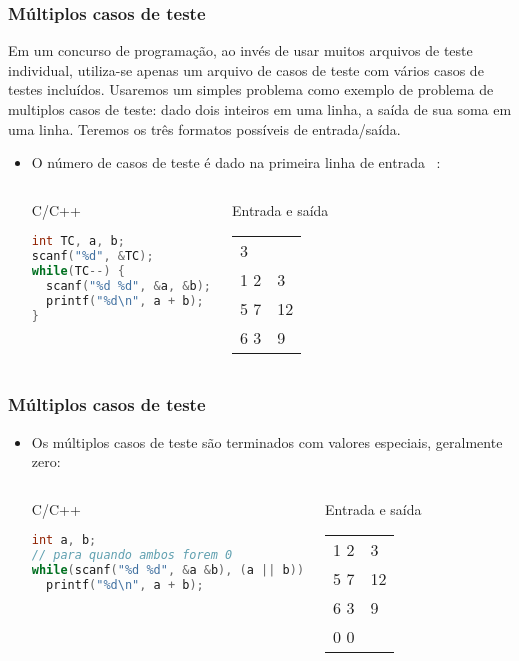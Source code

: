 \begin{frame} [fragile]
  \frametitle{Múltiplos casos de teste}
  {\small Em um concurso de programação, ao invés de usar muitos arquivos de teste individual, utiliza-se apenas um arquivo de casos de teste com vários casos de testes incluídos. Usaremos um simples problema como exemplo de problema de multiplos casos de teste: dado dois inteiros em uma linha, a saída de sua soma em uma linha. Teremos os três formatos possíveis de entrada/saída.}
    \begin{itemize}
      \item {\small O número de casos de teste é dado na primeira linha de entrada ~\cite{halim2013competitive}:}
      \begin{columns}
      \begin{block:ie}{C/C++}
	\begin{lstlisting}[language=c]
int TC, a, b;
scanf("%d", &TC);
while(TC--) {
  scanf("%d %d", &a, &b);
  printf("%d\n", a + b);
}
	\end{lstlisting}
      \end{block:ie}

      \begin{block:ie}{Entrada e saída}
	\begin{tabularx}{\textwidth}{|X|X|}
	  3&\\1 2&3\\5 7&12\\6 3 &9
	\end{tabularx}
      \end{block:ie}
    \end{columns}
  \end{itemize}
\end{frame}

\begin{frame} [fragile]
  \frametitle{Múltiplos casos de teste}
    \begin{itemize}
      \item {\small Os múltiplos casos de teste são terminados com valores especiais, geralmente zero:}
      \begin{columns}
      \begin{block:ie}{C/C++}
	\begin{lstlisting}[language=c]
int a, b;
// para quando ambos forem 0
while(scanf("%d %d", &a &b), (a || b))
  printf("%d\n", a + b);
	\end{lstlisting}
      \end{block:ie}

      \begin{block:ie}{Entrada e saída}
	\begin{tabularx}{\textwidth}{|X|X|}
	  1 2&3\\5 7&12\\6 3&9\\0 0&
	\end{tabularx}
      \end{block:ie}
    \end{columns}
  \end{itemize}
\end{frame}

